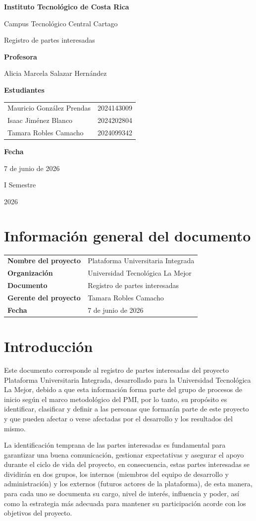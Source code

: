 \documentclass[11pt,spanish]{article}
\title{\DocumentoTitulo}
\author{\AutoresPortada}
\date{\FechaDocumento}
\makeatletter
\newcommand{\Institucion}{Instituto Tecnológico de Costa Rica}
\newcommand{\Campus}{Campus Tecnológico Central Cartago}
\newcommand{\DocumentoTitulo}{Registro de partes interesadas}
\newcommand{\Profesor}{Alicia Marcela Salazar Hernández}
\newcommand{\FechaDocumento}{7 de junio de 2026}
\newcommand{\PeriodoAcademico}{I Semestre}
\newcommand{\AnioDocumento}{2026}
\newcommand{\AutoresPortada}{%
    \begin{tabular}{l@{\hspace{1.5cm}}r}
        Mauricio González Prendas & 2024143009\\
        Isaac Jiménez Blanco & 2024202804\\
        Tamara Robles Camacho & 2024099342
    \end{tabular}%
}
\newcommand{\MakeCover}{%
\begin{titlepage}
\thispagestyle{empty}
\centering

{\bfseries \huge \Institucion \par}
\vspace{0.25cm}
{\LARGE \Campus \par}

\vfill

{\huge \DocumentoTitulo \par}

\vfill

{\bfseries \LARGE Profesora \par}
{\Large \Profesor \par}

\vfill

{\bfseries \LARGE Estudiantes \par}
{\Large \AutoresPortada \par}

\vfill

{\bfseries\LARGE Fecha \par}
{\Large \FechaDocumento \par}

\vfill

{\LARGE \PeriodoAcademico \par}
{\LARGE \AnioDocumento \par}

\end{titlepage}%
}
\makeatother
\begin{document}
\hypersetup{pageanchor=false}

\MakeCover

\pagestyle{empty}
\tableofcontents
\clearpage
{}
\hypersetup{pageanchor=true}
\pagestyle{fancy}


\section{Información general del documento}

\begin{table}[H]
\centering
\begin{tabularx}{\textwidth}{p{5cm} Y}
\toprule
\textbf{Nombre del proyecto} & Plataforma Universitaria Integrada \\
\textbf{Organización} & Universidad Tecnológica La Mejor \\
\textbf{Documento} & \DocumentoTitulo \\
\textbf{Gerente del proyecto} & Tamara Robles Camacho \\
\textbf{Fecha} & \FechaDocumento \\
\bottomrule
\end{tabularx}
\end{table}

\section{Introducción}

Este documento corresponde al registro de partes interesadas del proyecto Plataforma Universitaria Integrada, desarrollado para la Universidad Tecnológica La Mejor, debido a que esta información forma parte del grupo de procesos de inicio según el marco metodológico del PMI, por lo tanto, su propósito es identificar, clasificar y definir a las personas que formarán parte de este proyecto y que pueden afectar o verse afectadas por el desarrollo y los resultados del mismo.

La identificación temprana de las partes interesadas es fundamental para garantizar una buena comunicación, gestionar expectativas y asegurar el apoyo durante el ciclo de vida del proyecto, en consecuencia, estas partes interesadas se dividirán en dos grupos, los internos (miembros del equipo de desarrollo y administración) y los externos (futuros actores de la plataforma), de esta manera, para cada uno se documenta su cargo, nivel de interés, influencia y poder, así como la estrategia más adecuada para mantener su participación acorde con los objetivos del proyecto.
\end{document}

